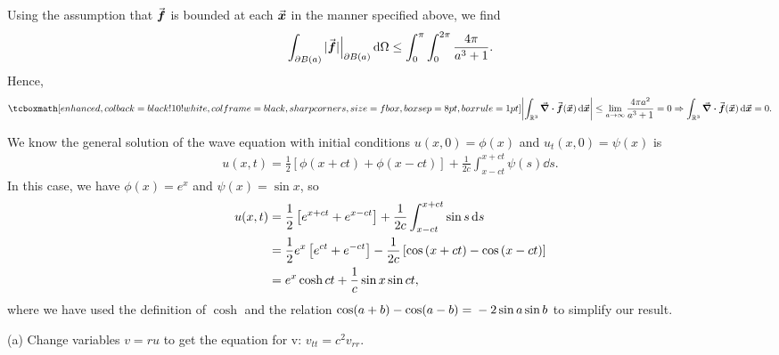 Using the assumption that $\va*{f}$ is bounded at each $\va*{x}$ in the manner specified above, we find
\begin{eqnarray}
    \label{eq:inequality-f}
    \int_{\partial B(a)} |\va*{f}|\Bigr|_{\partial B(a)} \dd{\Omega} \leq \int_{0}^{\pi}\int_{0}^{2\pi} \frac{4\pi}{a^3 + 1}
.\end{eqnarray}
Hence,
\begin{eqnarray}
    \label{eq:result-3_10}
    \eqbox{
        \left| \int_{\reals^3} \div{\va*{f}(\va*{x})} \dd{\va*{x}} \right| \leq \lim_{a \rightarrow \infty} \frac{4 \pi a^2}{a^3 + 1} = 0 \Rightarrow \int_{\reals^3} \div{\va*{f}(\va*{x})} \dd{\va*{x}} = 0
    } 
.\end{eqnarray}


We know the general solution of the wave equation with initial conditions $u(x,0) = \phi(x)$ and $u_{t}(x,0) = \psi(x)$ is 
\begin{eqnarray}
    \label{eq:wave-initial-cond-sol}
    u(x,t) = \frac{1}{2}\left[ \phi(x+ct) + \phi(x-ct) \right] + \frac{1}{2c}\int_{x - ct}^{x + ct} \psi(s) \dd{s}
.\end{eqnarray}
In this case, we have $\phi(x) = e^{x}$ and $\psi(x) = \sin{x}$, so
\begin{align}
    \label{eq:wave-soln}
    u(x,t) &= \frac{1}{2}\left[ e^{x + ct} + e^{x - ct} \right] + \frac{1}{2c}\int_{x-ct}^{x+ct} \sin{s} \dd{s} \notag \\
           &= \frac{1}{2}e^{x}\left[ e^{ct} + e^{-ct} \right] - \frac{1}{2c}\left[ \cos{(x+ct)} - \cos{(x-ct)} \right] \notag \\
           &= e^{x} \cosh{ct} + \frac{1}{c}\sin{x}\sin{ct}
,\end{align}
where we have used the definition of $\cosh$ and the relation $\cos(a+b) - \cos(a-b) = \\ -2\sin{a}\sin{b}$ to simplify our result. 


(a) Change variables $v = ru$ to get the equation for v: $v_{t t} = c^2 v_{rr}$.

